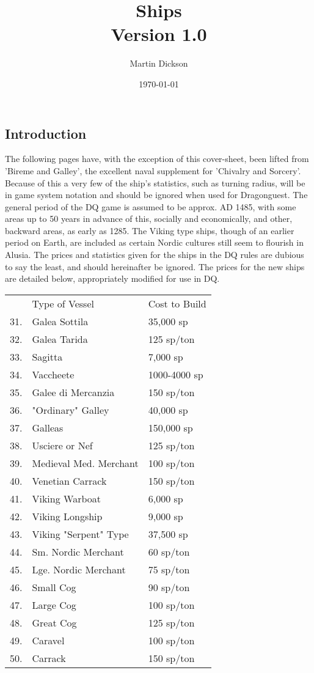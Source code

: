 \documentclass{article}
\title{Ships\\
Version 1.0}
\author{Martin Dickson}
\date{\today}
\begin{document}
\maketitle

\tableofcontents

\pagebreak

\begin{multicols}{2}

\section{Introduction}

The following pages have, with the exception of this cover-sheet, been
lifted from 'Bireme and Galley', the excellent naval supplement for
'Chivalry and Sorcery'.  Because of this a very few of the ship's
statistics, such as turning radius, will be in game system notation
and should be ignored when used for Dragonguest.  The general period
of the DQ game is assumed to be approx. AD 1485, with some areas up to
50 years in advance of this, socially and economically, and other,
backward areas, as early as 1285.  The Viking type ships, though of an
earlier period on Earth, are included as certain Nordic cultures still
seem to flourish in Alusia.  The prices and statistics given for the
ships in the DQ rules are dubious to say the least, and should
hereinafter be ignored.  The prices for the new ships are detailed
below, appropriately modified for use in DQ.


\begin{tabular}{lll}
	& Type of Vessel	& Cost to Build  \\
31.	&  Galea Sottila	& 35,000 sp \\
32.	&  Galea Tarida	& 125  sp/ton \\
33.	&  Sagitta	& 7,000  sp \\
34.	&  Vaccheete	& 1000-4000 sp \\
35.	&  Galee di Mercanzia	& 150  sp/ton \\
36.	&  "Ordinary" Galley	& 40,000 sp \\
37.	&  Galleas	& 150,000  sp \\
38.	&  Usciere or Nef	& 125  sp/ton \\
39.	&  Medieval Med. Merchant	& 100  sp/ton \\
40.	&  Venetian Carrack	& 150  sp/ton \\
41.	&  Viking Warboat	& 6,000  sp \\
42.	&  Viking Longship	& 9,000  sp \\
43.	&  Viking "Serpent" Type	& 37,500 sp \\
44.	&  Sm. Nordic Merchant	& 60 sp/ton \\
45.	&  Lge. Nordic Merchant	& 75 sp/ton \\
46.	&  Small  Cog	& 90 sp/ton \\
47.	&  Large  Cog	& 100  sp/ton \\
48.	&  Great  Cog	& 125  sp/ton \\
49.	&  Caravel	& 100  sp/ton \\
50.	&  Carrack	& 150  sp/ton \\
\end{tabular}


\end{multicols}
\end{document}
